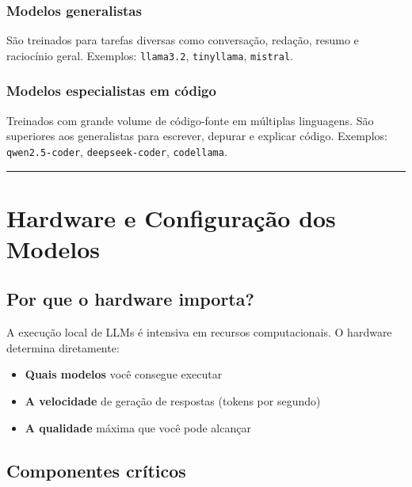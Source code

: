 \documentclass[
]{article}
\providecommand{\tightlist}{%
  \setlength{\itemsep}{0pt}\setlength{\parskip}{0pt}}
\begin{document}
\subsubsection{Modelos generalistas}\label{modelos-generalistas}

São treinados para tarefas diversas como conversação, redação, resumo e
raciocínio geral. Exemplos: \texttt{llama3.2}, \texttt{tinyllama},
\texttt{mistral}.

\subsubsection{Modelos especialistas em
código}\label{modelos-especialistas-em-cuxf3digo}

Treinados com grande volume de código-fonte em múltiplas linguagens. São
superiores aos generalistas para escrever, depurar e explicar código.
Exemplos: \texttt{qwen2.5-coder}, \texttt{deepseek-coder},
\texttt{codellama}.

\begin{center}\rule{0.5\linewidth}{0.5pt}\end{center}

\section{Hardware e Configuração dos
Modelos}\label{hardware-e-configurauxe7uxe3o-dos-modelos}

\subsection{Por que o hardware
importa?}\label{por-que-o-hardware-importa}

A execução local de LLMs é intensiva em recursos computacionais. O
hardware determina diretamente:

\begin{itemize}
\tightlist
\item
  \textbf{Quais modelos} você consegue executar
\item
  \textbf{A velocidade} de geração de respostas (tokens por segundo)
\item
  \textbf{A qualidade} máxima que você pode alcançar
\end{itemize}

\subsection{Componentes críticos}\label{componentes-cruxedticos}
\end{document}
